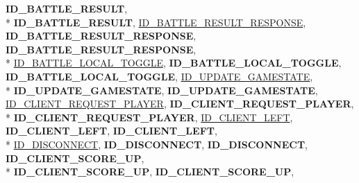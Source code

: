 \begin{DoxyCompactItemize}
{\bfseries I\-D\-\_\-\-B\-A\-T\-T\-L\-E\-\_\-\-R\-E\-S\-U\-L\-T}, 
\\*
{\bfseries I\-D\-\_\-\-B\-A\-T\-T\-L\-E\-\_\-\-R\-E\-S\-U\-L\-T}, 
\hyperlink{namespace_champ_net_plugin_a2ade5cfa7cf6c25ab7236c6b54a57821a0400430dae2bfdb56c3c5be84d5fc2b1}{I\-D\-\_\-\-B\-A\-T\-T\-L\-E\-\_\-\-R\-E\-S\-U\-L\-T\-\_\-\-R\-E\-S\-P\-O\-N\-S\-E}, 
{\bfseries I\-D\-\_\-\-B\-A\-T\-T\-L\-E\-\_\-\-R\-E\-S\-U\-L\-T\-\_\-\-R\-E\-S\-P\-O\-N\-S\-E}, 
{\bfseries I\-D\-\_\-\-B\-A\-T\-T\-L\-E\-\_\-\-R\-E\-S\-U\-L\-T\-\_\-\-R\-E\-S\-P\-O\-N\-S\-E}, 
\\*
\hyperlink{namespace_champ_net_plugin_a2ade5cfa7cf6c25ab7236c6b54a57821a01d87e1852357f746b5c583c76db4e23}{I\-D\-\_\-\-B\-A\-T\-T\-L\-E\-\_\-\-L\-O\-C\-A\-L\-\_\-\-T\-O\-G\-G\-L\-E}, 
{\bfseries I\-D\-\_\-\-B\-A\-T\-T\-L\-E\-\_\-\-L\-O\-C\-A\-L\-\_\-\-T\-O\-G\-G\-L\-E}, 
{\bfseries I\-D\-\_\-\-B\-A\-T\-T\-L\-E\-\_\-\-L\-O\-C\-A\-L\-\_\-\-T\-O\-G\-G\-L\-E}, 
\hyperlink{namespace_champ_net_plugin_a2ade5cfa7cf6c25ab7236c6b54a57821a6c390584862af2434c946e375365fe02}{I\-D\-\_\-\-U\-P\-D\-A\-T\-E\-\_\-\-G\-A\-M\-E\-S\-T\-A\-T\-E}, 
\\*
{\bfseries I\-D\-\_\-\-U\-P\-D\-A\-T\-E\-\_\-\-G\-A\-M\-E\-S\-T\-A\-T\-E}, 
{\bfseries I\-D\-\_\-\-U\-P\-D\-A\-T\-E\-\_\-\-G\-A\-M\-E\-S\-T\-A\-T\-E}, 
\hyperlink{namespace_champ_net_plugin_a2ade5cfa7cf6c25ab7236c6b54a57821a95ea635e1f4775e77d635b7039a9711e}{I\-D\-\_\-\-C\-L\-I\-E\-N\-T\-\_\-\-R\-E\-Q\-U\-E\-S\-T\-\_\-\-P\-L\-A\-Y\-E\-R}, 
{\bfseries I\-D\-\_\-\-C\-L\-I\-E\-N\-T\-\_\-\-R\-E\-Q\-U\-E\-S\-T\-\_\-\-P\-L\-A\-Y\-E\-R}, 
\\*
{\bfseries I\-D\-\_\-\-C\-L\-I\-E\-N\-T\-\_\-\-R\-E\-Q\-U\-E\-S\-T\-\_\-\-P\-L\-A\-Y\-E\-R}, 
\hyperlink{namespace_champ_net_plugin_a2ade5cfa7cf6c25ab7236c6b54a57821a170a6a655b34086567c4039a8e9ba81d}{I\-D\-\_\-\-C\-L\-I\-E\-N\-T\-\_\-\-L\-E\-F\-T}, 
{\bfseries I\-D\-\_\-\-C\-L\-I\-E\-N\-T\-\_\-\-L\-E\-F\-T}, 
{\bfseries I\-D\-\_\-\-C\-L\-I\-E\-N\-T\-\_\-\-L\-E\-F\-T}, 
\\*
\hyperlink{namespace_champ_net_plugin_a2ade5cfa7cf6c25ab7236c6b54a57821ab64ca706dd3c8029ea9dc9a239237e15}{I\-D\-\_\-\-D\-I\-S\-C\-O\-N\-N\-E\-C\-T}, 
{\bfseries I\-D\-\_\-\-D\-I\-S\-C\-O\-N\-N\-E\-C\-T}, 
{\bfseries I\-D\-\_\-\-D\-I\-S\-C\-O\-N\-N\-E\-C\-T}, 
{\bfseries I\-D\-\_\-\-C\-L\-I\-E\-N\-T\-\_\-\-S\-C\-O\-R\-E\-\_\-\-U\-P}, 
\\*
{\bfseries I\-D\-\_\-\-C\-L\-I\-E\-N\-T\-\_\-\-S\-C\-O\-R\-E\-\_\-\-U\-P}, 
{\bfseries I\-D\-\_\-\-C\-L\-I\-E\-N\-T\-\_\-\-S\-C\-O\-R\-E\-\_\-\-U\-P}, 

\end{DoxyCompactItemize}
